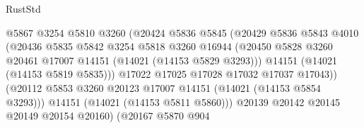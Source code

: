 \begin{lexlean}{RustStd}
\begin{coremodule}
                                        @5867
                                        @3254
                                        @5810
                                        @3260
                                        (@20424
                                          @5836
                                          @5845
                                          (@20429
                                            @5836
                                            @5843
                                            @4010
                                            (@20436
                                              @5835
                                              @5842
                                              @3254
                                              @5818
                                              @3260
                                              @16944
                                              (@20450
                                                @5828
                                                @3260
                                                @20461
                                                @17007
                                                @14151
                                                (@14021 (@14153 @5829 @3293)))
                                              @14151
                                              (@14021 (@14153 @5819 @5835)))
                                            @17022
                                            @17025
                                            @17028
                                            @17032
                                            @17037
                                            @17043))
                                        (@20112
                                          @5853
                                          @3260
                                          @20123
                                          @17007
                                          @14151
                                          (@14021 (@14153 @5854 @3293)))
                                        @14151
                                        (@14021 (@14153 @5811 @5860)))
                                      @20139
                                      @20142
                                      @20145
                                      @20149
                                      @20154
                                      @20160)
                                    (@20167
                                      @5870
                                      @904

\end{coremodule}
\end{lexlean}

